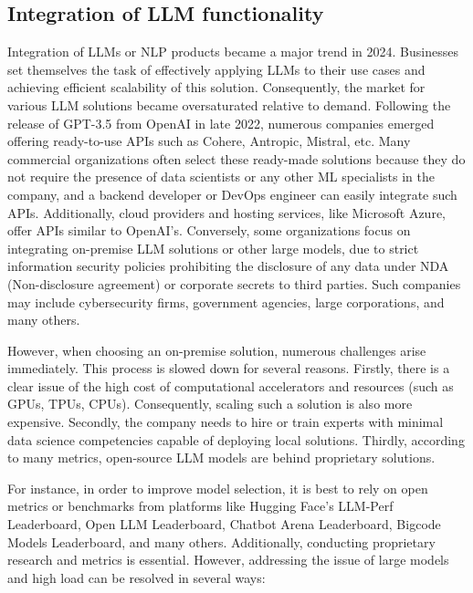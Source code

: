 \subsection{Integration of LLM functionality}
Integration of LLMs or NLP products became a major trend in 2024. Businesses set themselves the task of effectively applying LLMs to their use cases and achieving efficient scalability of this solution. Consequently, the market for various LLM solutions became oversaturated relative to demand. Following the release of GPT-3.5 from OpenAI in late 2022, numerous companies emerged offering ready-to-use APIs such as Cohere, Antropic, Mistral, etc. Many commercial organizations often select these ready-made solutions because they do not require the presence of data scientists or any other ML specialists in the company, and a backend developer or DevOps engineer can easily integrate such APIs. Additionally, cloud providers and hosting services, like Microsoft Azure, offer APIs similar to OpenAI's. Conversely, some organizations focus on integrating on-premise LLM solutions or other large models, due to strict information security policies prohibiting the disclosure of any data under NDA (Non-disclosure agreement) or corporate secrets to third parties. Such companies may include cybersecurity firms, government agencies, large corporations, and many others.

However, when choosing an on-premise solution, numerous challenges arise immediately. This process is slowed down for several reasons. Firstly, there is a clear issue of the high cost of computational accelerators and resources (such as GPUs, TPUs, CPUs). Consequently, scaling such a solution is also more expensive. Secondly, the company needs to hire or train experts with minimal data science competencies capable of deploying local solutions. Thirdly, according to many metrics, open-source LLM models are behind proprietary solutions.

For instance, in order to improve model selection, it is best to rely on open metrics or benchmarks from platforms like Hugging Face's LLM-Perf Leaderboard, Open LLM Leaderboard, Chatbot Arena Leaderboard, Bigcode Models Leaderboard, and many others. Additionally, conducting proprietary research and metrics is essential. However, addressing the issue of large models and high load can be resolved in several ways:

